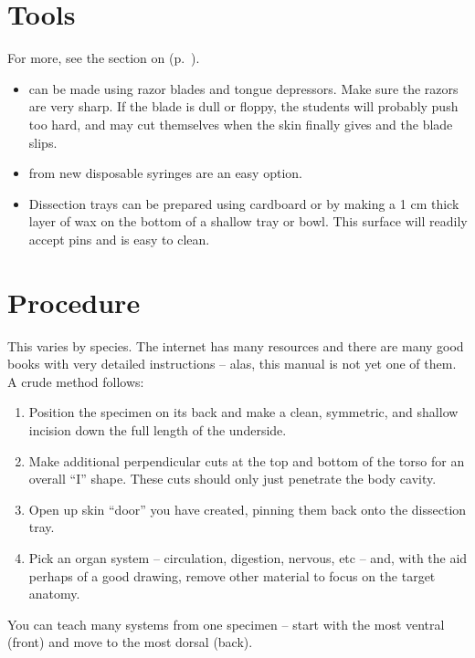 \section{Tools}
For more, see the section on  (p.~\pageref{cha:labequip}).

\begin{itemize}

\item{ can be made using razor blades and tongue depressors. Make sure the razors are very sharp. If the blade is dull or floppy, the students will probably push too hard, 
and may cut themselves when the skin finally gives and the blade slips.}

\item{ from new disposable syringes are an easy option.}

\item{Dissection trays can be prepared 
using cardboard or by making a 1 cm thick layer of wax on the bottom of a shallow tray or bowl. 
This surface will readily accept pins and is easy to clean.}

\end{itemize}

\section{Procedure}

This varies by species. The internet has many resources and there are many good books with very detailed instructions – alas, this manual is not yet one of them. A crude method follows:
\begin{enumerate}
\item Position the specimen on its back and make a clean, symmetric, and shallow incision down the full length of the underside. 
\item Make additional perpendicular cuts at the top and bottom of the torso for an overall “I” shape. These cuts should only just penetrate the body cavity. 
\item Open up skin ``door'' you have created, pinning them back onto the dissection tray. 
\item Pick an organ system – circulation, digestion, nervous, etc – and, with the aid perhaps of a good drawing, remove other material to focus on the target anatomy.
\end{enumerate}
You can teach many systems from one specimen – start with the most ventral (front) and move to the most dorsal (back).

